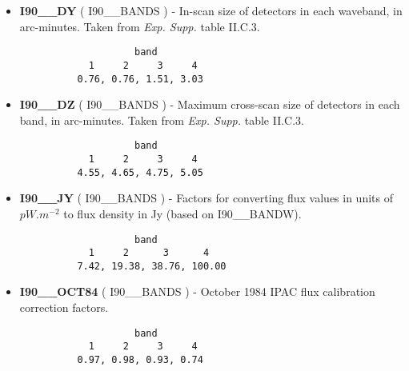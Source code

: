 \begin{itemize}
\begin{minipage}[t]{\textwidth}
\begin{verbatim}
\end{verbatim}
\normalsize
\end{minipage}

\item {\bf I90\_\_DY} ( I90\_\_BANDS ) -     In-scan size of detectors in each waveband, in
arc-minutes. Taken from {\em Exp. Supp.} table II.C.3. 

\begin{minipage}[t]{\textwidth}
\small
\begin{verbatim}
                    band
            1     2     3     4   
          0.76, 0.76, 1.51, 3.03
\end{verbatim}
\normalsize
\end{minipage}

\item {\bf I90\_\_DZ} ( I90\_\_BANDS ) -     Maximum cross-scan size of detectors in each 
band, in arc-minutes. Taken from {\em Exp. Supp.} table II.C.3.

\begin{minipage}[t]{\textwidth}
\small
\begin{verbatim}
                    band
            1     2     3     4   
          4.55, 4.65, 4.75, 5.05
\end{verbatim}
\normalsize
\end{minipage}

\item {\bf I90\_\_JY} ( I90\_\_BANDS ) -     Factors for converting flux values in units 
of $pW.m^{-2}$ to flux density in Jy (based on I90\_\_BANDW).

\begin{minipage}[t]{\textwidth}
\small
\begin{verbatim}
                    band
            1     2      3      4   
          7.42, 19.38, 38.76, 100.00
\end{verbatim}
\normalsize
\end{minipage}

\item {\bf I90\_\_OCT84} ( I90\_\_BANDS ) -  October 1984 IPAC flux calibration correction
factors.

\begin{minipage}[t]{\textwidth}
\small
\begin{verbatim}
                    band
            1     2     3     4   
          0.97, 0.98, 0.93, 0.74
\end{verbatim}
\normalsize
\end{minipage}


\end{itemize}
